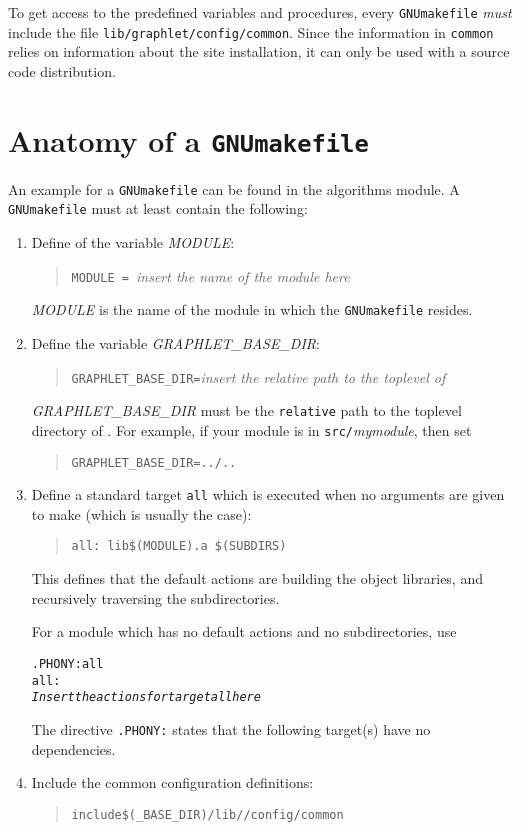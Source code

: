 \documentclass[twoside,fleqn]{report}
\begin{document}
To get access to the predefined variables and procedures, every 
\texttt{GNUmakefile} \emph{must} include the file 
\texttt{lib/graphlet/config/common}.  Since the information in 
\texttt{common} relies on information about the site installation, it 
can only be used with a source code distribution.


%
%

\section{Anatomy of a \texttt{GNUmakefile}}

An example for a \texttt{GNUmakefile} can be found in the algorithms 
module.  A \texttt{GNUmakefile} must at least contain the following:

\begin{enumerate}

  \item  Define of the variable \emph{MODULE}:
  \begin{quote}
    \texttt{MODULE = }\emph{insert the name of the module here}
  \end{quote}
  \emph{MODULE} is the name of the module in which the
  \texttt{GNUmakefile} resides.  

  \item  Define the variable \emph{GRAPHLET\_BASE\_DIR}:
  \begin{quote}
    \texttt{GRAPHLET\_BASE\_DIR=}\emph{insert the relative path to the
    toplevel of \Graphlet{}}
  \end{quote}
  \emph{GRAPHLET\_BASE\_DIR} must be the \texttt{relative} path to the 
  toplevel directory of \Graphlet{}.  For example, if your module is in 
  \texttt{src/}\emph{mymodule}, then set
  \begin{quote}
    \texttt{GRAPHLET\_BASE\_DIR=../..}
  \end{quote}
  
  \item 
  Define a standard target \texttt{all} which is executed when
  no arguments are given to make (which is usually the case):
  \begin{quote}
    \texttt{all:    lib\$(MODULE).a \$(SUBDIRS)}
  \end{quote}
  This defines that the default actions are building the
  object libraries, and recursively traversing the subdirectories.
  
  For a module which has no default actions and no
  subdirectories, use
  \begin{alltt}
.PHONY: all
all:    
        \emph{Insert the actions for target \texttt{all} here}
\end{alltt}
   \noindent The directive \texttt{.PHONY:} states that the following target(s)
    have no dependencies.
  
  \item Include the common configuration definitions:
  \begin{quote}
    \texttt{include\$(\Graphlet{}\_BASE\_DIR)/lib/\Graphlet{}/config/common}
  \end{quote}
  
\end{enumerate}
\end{document}
